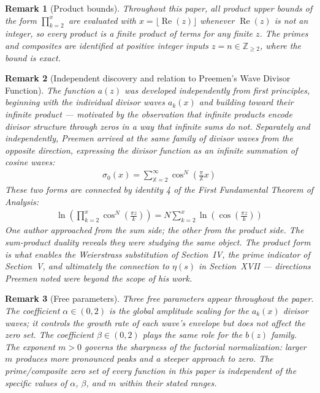 \documentclass{article}
\newtheorem*{remark}{Remark}
\begin{document}
\begin{remark}[Product bounds]
Throughout this paper, all product upper bounds of the form $\prod_{k=2}^{x}$ are evaluated with $x = \lfloor \operatorname{Re}(z) \rfloor$ whenever $\operatorname{Re}(z)$ is not an integer, so every product is a finite product of terms for any finite $z$. The primes and composites are identified at positive integer inputs $z = n \in \mathbb{Z}_{\geq 2}$, where the bound is exact.
\end{remark}

\begin{remark}[Independent discovery and relation to Preemen's Wave Divisor Function]
The function $a(z)$ was developed independently from first principles, beginning with the individual divisor waves $a_k(x)$ and building toward their infinite product — motivated by the observation that infinite products encode divisor structure through zeros in a way that infinite sums do not. Separately and independently, Preemen \cite{preemen2020wave} arrived at the same family of divisor waves from the opposite direction, expressing the divisor function as an infinite \emph{summation} of cosine waves:
\begin{align*}
\sigma_0(x) = \sum_{\mathbb{X}=2}^{\infty} \cos^N\!\left(\frac{\pi}{\mathbb{X}}x\right)
\end{align*}
These two forms are connected by identity 4 of the First Fundamental Theorem of Analysis:
\begin{align*}
\ln\!\left(\prod_{k=2}^{x} \cos^N\!\left(\frac{\pi z}{k}\right)\right) = N\sum_{k=2}^{x} \ln\!\left(\cos\!\left(\frac{\pi z}{k}\right)\right)
\end{align*}
One author approached from the sum side; the other from the product side. The sum-product duality reveals they were studying the same object. The product form is what enables the Weierstrass substitution of Section~IV, the prime indicator of Section~V, and ultimately the connection to $\eta(s)$ in Section~XVII — directions Preemen noted were beyond the scope of his work.
\end{remark}

\begin{remark}[Free parameters]
Three free parameters appear throughout the paper. The coefficient $\alpha \in (0,2)$ is the global amplitude scaling for the $a_k(x)$ divisor waves; it controls the growth rate of each wave's envelope but does not affect the zero set. The coefficient $\beta \in (0,2)$ plays the same role for the $b(z)$ family. The exponent $m > 0$ governs the sharpness of the factorial normalization: larger $m$ produces more pronounced peaks and a steeper approach to zero. The prime/composite zero set of every function in this paper is independent of the specific values of $\alpha$, $\beta$, and $m$ within their stated ranges.
\end{remark}
\end{document}
